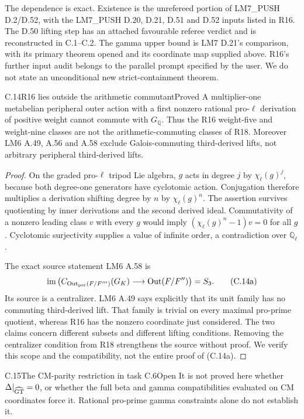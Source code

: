 The dependence is exact. Existence is the
unrefereed portion of LM7\_PUSH D.2/D.52,
with the LM7\_PUSH D.20, D.21, D.51 and D.52
inputs listed in R16. The D.50 lifting step
has an attached favourable referee verdict
and is reconstructed in C.1--C.2.
The gamma upper bound is LM7 D.21's comparison,
with its primary theorem opened and its
coordinate map supplied above.
R16's further input audit belongs to the
parallel prompt specified by the user.
We do not state an unconditional new
strict-containment theorem.

\begin{statement}{C.14}{R16 lies outside the arithmetic commutant}{Proved}
A multiplier-one metabelian peripheral outer
action with a first nonzero rational
pro-\(\ell\) derivation of positive weight
cannot commute with \(G_{\mathbb Q}\).
Thus the R16 weight-five and weight-nine
classes are not the arithmetic-commuting
classes of R18.
Moreover LM6 A.49, A.56 and A.58 exclude
Galois-commuting third-derived lifts,
not arbitrary peripheral third-derived lifts.
\end{statement}
\begin{proof}
On the graded pro-\(\ell\) tripod Lie algebra,
\(g\) acts in degree \(j\) by
\(\chi_\ell(g)^j\), because both degree-one
generators have cyclotomic action.
Conjugation therefore multiplies a derivation
shifting degree by \(n\) by \(\chi_\ell(g)^n\).
The assertion survives quotienting by inner
derivations and the second derived ideal.
Commutativity of a nonzero leading class \(v\)
with every \(g\) would imply
\((\chi_\ell(g)^n-1)v=0\) for all \(g\).
Cyclotomic surjectivity supplies a value
of infinite order, a contradiction over
\(\mathbb Q_\ell\).

The exact source statement LM6 A.58 \citep{cLM6} is
\[
 \operatorname{im}\left(
 C_{\operatorname{Out}_{\rm per}(F/F''')}(G_K)
       \longrightarrow\operatorname{Out}(F/F'')\right)=S_3.
 \tag{C.14a}
\]
Its source is a centralizer. LM6 A.49 says
explicitly that its unit family has no
commuting third-derived lift.
That family is trivial on every maximal
pro-prime quotient, whereas R16 has the
nonzero coordinate just considered.
The two claims concern different subsets
and different lifting conditions.
Removing the centralizer condition from
R18 strengthens the source without proof.
We verify this scope and the compatibility,
not the entire proof of (C.14a).
\end{proof}

\begin{statement}{C.15}{The CM-parity restriction in task C.6}{Open}
It is not proved here whether
\(\Delta|_{\widehat{\rm GT}}=0\),
or whether the full beta and gamma
compatibilities evaluated on CM coordinates
force it. Rational pro-prime gamma
constraints alone do not establish it.
\end{statement}

